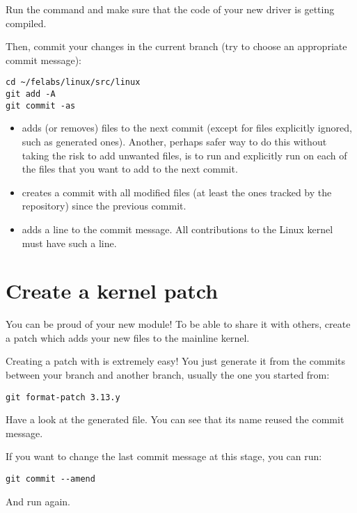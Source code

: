 Run the  command and make sure that the code of your new
driver is getting compiled. 

Then, commit your changes in the current branch (try to choose an
appropriate commit message):

\begin{verbatim}
cd ~/felabs/linux/src/linux
git add -A
git commit -as
\end{verbatim}

\begin{itemize}
\item {} adds (or removes) files to the next commit
      (except for files explicitly ignored, such as generated ones).
      Another, perhaps safer way to do this without taking the risk
      to add unwanted files, is to run  and explicitly
      run  on each of the files that you want to 
      add to the next commit.
\item {} creates a commit with all modified files
      (at least the ones tracked by the repository) since the previous
      commit.
\item {} adds a  line to the
      commit message. All contributions to the Linux kernel must have
      such a line.
\end{itemize}

\section{Create a kernel patch}

You can be proud of your new module! To be able to share it with
others, create a patch which adds your new files to the mainline
kernel.

Creating a patch with  is extremely easy! You just generate it
from the commits between your branch and another branch, usually the
one you started from:

\begin{verbatim}
git format-patch 3.13.y
\end{verbatim}

Have a look at the generated file. You can see that its name reused
the commit message.

If you want to change the last commit message at this stage, you 
can run:

\begin{verbatim}
git commit --amend
\end{verbatim}

And run  again.
